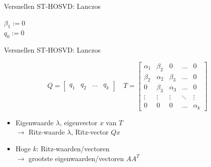 \documentclass[t,12pt,dutch
\ifx\beamermode\undefined\else,\beamermode\fi
]{beamer}
\begin{document}
\begin{frame}{Versnellen ST-HOSVD: Lanczos}

\begin{algorithm}[H]
$\beta_1 := 0$\\
$q_0 := 0$\\
\end{algorithm}

\end{frame}

\begin{frame}{Versnellen ST-HOSVD: Lanczos}

\[
Q = 
\begin{bmatrix}
q_1 & q_2 & \dots & q_k
\end{bmatrix}
\quad
T = \begin{bmatrix}
\alpha_1 & \beta_2 & 0 & \dots & 0 \\
\beta_2 & \alpha_2 & \beta_3 & \dots & 0 \\
0 & \beta_3 & \alpha_3 & \dots & 0 \\
\vdots & \vdots & \vdots & \ddots & \vdots \\
0 & 0 & 0 & \dots & \alpha_k
\end{bmatrix}
\]

\begin{itemize}
\item Eigenwaarde $\lambda$, eigenvector $x$ van $T$\\
$\rightarrow$ Ritz-waarde $\lambda$, Ritz-vector $Qx$
\item Hoge $k$: Ritz-waarden/vectoren\\
$\rightarrow$ grootste eigenwaarden/vectoren $A A^T$
\end{itemize}

\end{frame}
\end{document}

